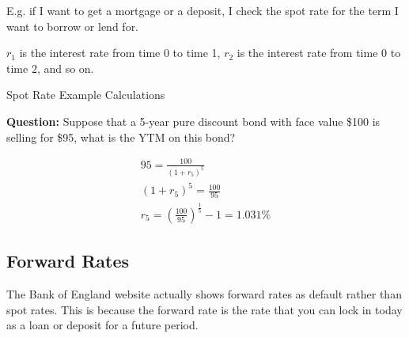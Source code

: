 E.g. if I want to get a mortgage or a deposit, I check the spot rate for the term I want to borrow or lend for.\\

\begin{figure}[H]
    \centering
    
\end{figure}

$r_1$ is the interest rate from time 0 to time 1, $r_2$ is the interest rate from time 0 to time 2, and so on.\\

\begin{examplebox}{Spot Rate Example Calculations}

\textbf{Question:} Suppose that a 5-year pure discount bond with face value \$100 is selling for \$95, what is the YTM on this bond?

\begin{align*}
    95 = \frac{100}{(1 + r_5)^5} \\
    (1+r_5)^5 = \frac{100}{95} \\
    r_5 = \left(\frac{100}{95}\right)^{\frac{1}{5}} - 1 = 1.031\%
\end{align*}

\end{examplebox}

\subsection*{Forward Rates}

The Bank of England website actually shows forward rates as default rather than spot rates. This is because the forward rate is the rate that you can lock in today as a loan or deposit for a future period.\\

